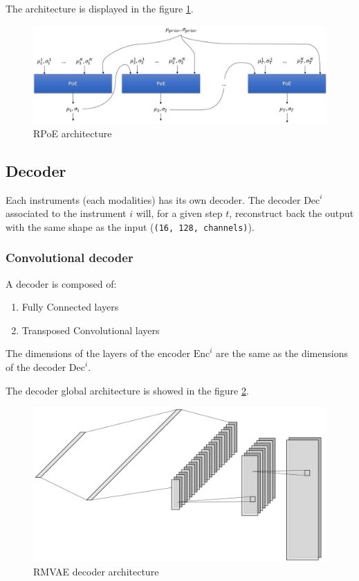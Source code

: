 \documentclass[12pt]{report}
\begin{document}
The architecture is displayed in the figure \ref{fig:rpoe_architecture}.

\begin{figure}[h]
    \centering
    \includegraphics[width=\textwidth]{images/nn/architectures/rmvae/rpoe_architecture.jpg}
    \caption{RPoE architecture}
    \label{fig:rpoe_architecture}
\end{figure}


\subsection{Decoder}
\label{sec:decoder}

Each instruments (each modalities) has its own decoder.
The decoder $\text{Dec}^i$ associated to the instrument $i$ will, for a given step $t$, reconstruct back the output with the same shape as the input (\texttt{(16, 128, channels)}).

\subsubsection{Convolutional decoder}
\label{sec:decoder:cnn}

A decoder is composed of:
\begin{enumerate}
    \item Fully Connected layers
    \item Transposed Convolutional layers
\end{enumerate}
The dimensions of the layers of the encoder $\text{Enc}^i$ are the same as the dimensions of the decoder $\text{Dec}^i$.

The decoder global architecture is showed in the figure \ref{fig:rmvae_decoder}.

\begin{figure}[ht]
    \centering
    \includegraphics[width=\textwidth]{images/nn/architectures/rmvae/decoder.jpg}
    \caption{RMVAE decoder architecture}
    \label{fig:rmvae_decoder}
\end{figure}
\end{document}
